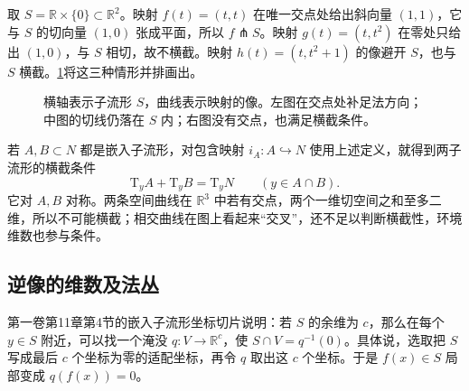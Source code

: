 \begin{example}\label{g2:exm:transverse-curves}
	取 \(S=\mathbb R\times\{0\}\subset\mathbb R^2\)。映射 \(f(t)=(t,t)\) 在唯一交点处给出斜向量 \((1,1)\)，它与 \(S\) 的切向量 \((1,0)\) 张成平面，所以 \(f\pitchfork S\)。映射 \(g(t)=(t,t^2)\) 在零处只给出 \((1,0)\)，与 \(S\) 相切，故不横截。映射 \(h(t)=(t,t^2+1)\) 的像避开 \(S\)，也与 \(S\) 横截。\cref{g2:fig:transversality-curves}将这三种情形并排画出。
\end{example}

\begin{figure}[htbp]
	\centering
	
	\caption[横截、相切与空交]{横轴表示子流形 \(S\)，曲线表示映射的像。左图在交点处补足法方向；中图的切线仍落在 \(S\) 内；右图没有交点，也满足横截条件。}
	\label{g2:fig:transversality-curves}
\end{figure}

若 \(A,B\subset N\) 都是嵌入子流形，对包含映射 \(i_A:A\hookrightarrow N\) 使用上述定义，就得到两子流形的横截条件
\[
	\mathrm{T}_yA+\mathrm{T}_yB=\mathrm{T}_yN\qquad(y\in A\cap B).
\]
它对 \(A,B\) 对称。两条空间曲线在 \(\mathbb R^3\) 中若有交点，两个一维切空间之和至多二维，所以不可能横截；相交曲线在图上看起来“交叉”，还不足以判断横截性，环境维数也参与条件。

\subsection{逆像的维数及法丛}
\label{g2:subsec:1403:02}

第一卷第11章第4节的嵌入子流形坐标切片说明：若 \(S\) 的余维为 \(c\)，那么在每个 \(y\in S\) 附近，可以找一个淹没 \(q:V\to\mathbb R^c\)，使 \(S\cap V=q^{-1}(0)\)。具体说，选取把 \(S\) 写成最后 \(c\) 个坐标为零的适配坐标，再令 \(q\) 取出这 \(c\) 个坐标。于是 \(f(x)\in S\) 局部变成 \(q(f(x))=0\)。

